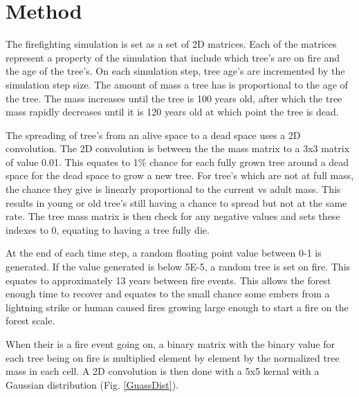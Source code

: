\documentclass[ aps, pra, reprint, notitlepage ]{revtex4-1}
\begin{document}
\section{\label{Method}Method}

The firefighting simulation is set as a set of 2D matrices. Each of the matrices represent a property of the simulation that include which tree's are on fire and the age of the tree's. On each simulation step, tree age's are incremented by the simulation step size. The amount of mass a tree has is proportional to the age of the tree. The mass increases until the tree is 100 years old, after which the tree mass rapidly decreases until it is 120 years old at which point the tree is dead.

The spreading of tree's from an alive space to a dead space uses a 2D convolution. The 2D convolution is between the the mass matrix to a 3x3 matrix of value 0.01. This equates to 1\% chance for each fully grown tree around a dead space for the dead space to grow a new tree. For tree's which are not at full mass, the chance they give is linearly proportional to the current vs adult mass. This results in young or old tree's still having a chance to spread but not at the same rate. The tree mass matrix is then check for any negative values and sets these indexes to 0, equating to having a tree fully die.

At the end of each time step, a random floating point value between 0-1 is generated. If the value generated is below 5E-5, a random tree is set on fire. This equates to approximately 13 years between fire events. This allows the forest enough time to recover and equates to the small chance some embers from a lightning strike or human caused fires growing large enough to start a fire on the forest scale.

When their is a fire event going on, a binary matrix with the binary value for each tree being on fire is multiplied element by element by the normalized tree mass in each cell. A 2D convolution is then done with a 5x5 kernal with a Gaussian distribution (Fig. \ref{GuassDist}).
	
\end{document}
